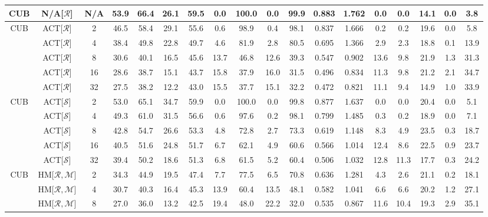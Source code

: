 \begin{table*}
{\begin{tabular}{c|cc|cccc|ccccc|ccccc|c}
CUB & N/A{[}$\mathcal{R}${]} & N/A & 53.9 & 66.4 & 26.1 & 59.5 & 0.0 & 100.0 & 0.0 & 99.9 & 0.883 & 1.762 & 0.0 & 0.0 & 14.1 & 0.0 & 3.8\tabularnewline
\hline
\multirow{5}{*}{CUB} & \textcolor{tab:cyan}{ACT{[}$\mathcal{R}${]}}\cite{robrank} & 2 & 46.5 & 58.4 & 29.1 & 55.6 & 0.6 & 98.9 & 0.4 & 98.1 & 0.837 & 1.666 & 0.2 & 0.2 & 19.6 & 0.0 & 5.8\tabularnewline
\rowcolor{black!7}\cellcolor{white} & \textcolor{tab:cyan}{ACT{[}$\mathcal{R}${]}}\cite{robrank} & 4 & 38.4 & 49.8 & 22.8 & 49.7 & 4.6 & 81.9 & 2.8 & 80.5 & 0.695 & 1.366 & 2.9 & 2.3 & 18.8 & 0.1 & 13.9\tabularnewline
 & \textcolor{tab:cyan}{ACT{[}$\mathcal{R}${]}}\cite{robrank} & 8 & 30.6 & 40.1 & 16.5 & 45.6 & 13.7 & 46.8 & 12.6 & 39.3 & 0.547 & 0.902 & 13.6 & 9.8 & 21.9 & 1.3 & 31.3\tabularnewline
\rowcolor{black!7}\cellcolor{white} & \textcolor{tab:cyan}{ACT{[}$\mathcal{R}${]}}\cite{robrank} & 16 & 28.6 & 38.7 & 15.1 & 43.7 & 15.8 & 37.9 & 16.0 & 31.5 & 0.496 & 0.834 & 11.3 & 9.8 & 21.2 & 2.1 & 34.7\tabularnewline
 & \textcolor{tab:cyan}{ACT{[}$\mathcal{R}${]}}\cite{robrank} & 32 & 27.5 & 38.2 & 12.2 & 43.0 & 15.5 & 37.7 & 15.1 & 32.2 & 0.472 & 0.821 & 11.1 & 9.4 & 14.9 & 1.0 & 33.9\tabularnewline
\hline
\multirow{5}{*}{CUB} & \textcolor{tab:orange}{ACT{[}$\mathcal{S}${]}}\cite{robrank} & 2 & 53.0 & 65.1 & 34.7 & 59.9 & 0.0 & 100.0 & 0.0 & 99.8 & 0.877 & 1.637 & 0.0 & 0.0 & 20.4 & 0.0 & 5.1\tabularnewline
\rowcolor{black!7}\cellcolor{white}& \textcolor{tab:orange}{ACT{[}$\mathcal{S}${]}}\cite{robrank} & 4 & 49.3 & 61.0 & 31.5 & 56.6 & 0.6 & 97.6 & 0.2 & 98.1 & 0.799 & 1.485 & 0.3 & 0.2 & 18.9 & 0.0 & 7.1\tabularnewline
& \textcolor{tab:orange}{ACT{[}$\mathcal{S}${]}}\cite{robrank} & 8 & 42.8 & 54.7 & 26.6 & 53.3 & 4.8 & 72.8 & 2.7 & 73.3 & 0.619 & 1.148 & 8.3 & 4.9 & 23.5 & 0.3 & 18.7\tabularnewline
\rowcolor{black!7}\cellcolor{white}& \textcolor{tab:orange}{ACT{[}$\mathcal{S}${]}}\cite{robrank} & 16 & 40.5 & 51.6 & 24.8 & 51.7 & 6.7 & 62.1 & 4.9 & 60.6 & 0.566 & 1.014 & 12.4 & 8.6 & 22.5 & 0.9 & 23.7\tabularnewline
& \textcolor{tab:orange}{ACT{[}$\mathcal{S}${]}}\cite{robrank} & 32 & 39.4 & 50.2 & 18.6 & 51.3 & 6.8 & 61.5 & 5.2 & 60.4 & 0.506 & 1.032 & 12.8 & 11.3 & 17.7 & 0.3 & 24.2\tabularnewline
\hline
\multirow{5}{*}{CUB} & HM{[}$\mathcal{R},\mathcal{M}${]} & 2 & 34.3 & 44.9 & 19.5 & 47.4 & 7.7 & 77.5 & 6.5 & 70.8 & 0.636 & 1.281 & 4.3 & 2.6 & 21.1 & 0.2 & 18.1\tabularnewline
\rowcolor{black!7}\cellcolor{white} & HM{[}$\mathcal{R},\mathcal{M}${]} & 4 & 30.7 & 40.3 & 16.4 & 45.3 & 13.9 & 60.4 & 13.5 & 48.1 & 0.582 & 1.041 & 6.6 & 6.6 & 20.2 & 1.2 & 27.1\tabularnewline
 & HM{[}$\mathcal{R},\mathcal{M}${]} & 8 & 27.0 & 36.0 & 13.2 & 42.5 & 19.4 & 48.0 & 22.2 & 32.0 & 0.535 & 0.867 & 11.6 & 10.4 & 19.3 & 2.9 & 35.1\tabularnewline

\end{tabular}}
\end{table*}
